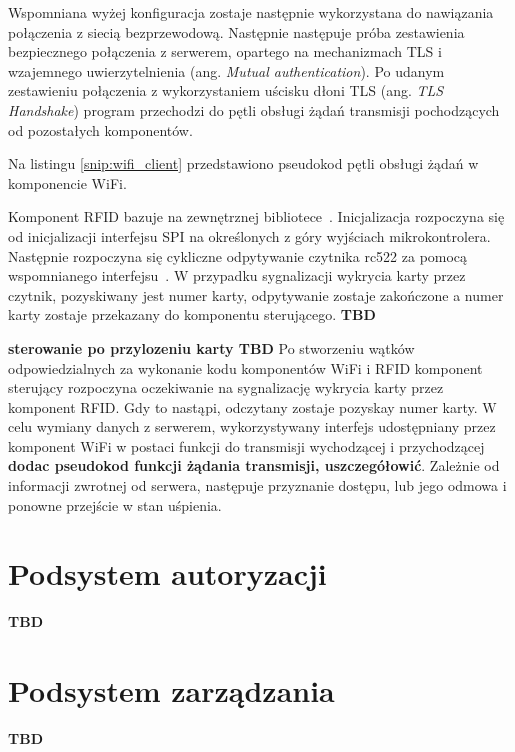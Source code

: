                Wspomniana wyżej konfiguracja zostaje następnie wykorzystana do nawiązania połączenia z siecią bezprzewodową. Następnie następuje próba zestawienia bezpiecznego połączenia z serwerem, opartego na mechanizmach TLS i wzajemnego uwierzytelnienia (ang. \textit{Mutual authentication}). Po udanym zestawieniu połączenia z wykorzystaniem uścisku dłoni TLS (ang. \textit{TLS Handshake}) program przechodzi do pętli obsługi żądań transmisji pochodzących od pozostałych komponentów.

                Na listingu \ref{snip:wifi_client} przedstawiono pseudokod pętli obsługi żądań w komponencie WiFi.

                

                Komponent RFID bazuje na zewnętrznej bibliotece~\cite{esp-idf-rc522}. Inicjalizacja rozpoczyna się od inicjalizacji interfejsu SPI na określonych z góry wyjściach mikrokontrolera. Następnie rozpoczyna się cykliczne odpytywanie czytnika rc522 za pomocą wspomnianego interfejsu~\cite{esp-idf-rc522}. W przypadku sygnalizacji wykrycia karty przez czytnik, pozyskiwany jest numer karty, odpytywanie zostaje zakończone a numer karty zostaje przekazany do komponentu sterującego. \textbf{TBD}

                \textbf{sterowanie po przylozeniu karty TBD}
                Po stworzeniu wątków odpowiedzialnych za wykonanie kodu komponentów WiFi i RFID komponent sterujący rozpoczyna oczekiwanie na sygnalizację wykrycia karty przez komponent RFID. Gdy to nastąpi, odczytany zostaje pozyskay numer karty. W celu wymiany danych z serwerem, wykorzystywany interfejs udostępniany przez komponent WiFi w postaci funkcji do transmisji wychodzącej i przychodzącej \textbf{dodac pseudokod funkcji żądania transmisji, uszczegółowić}. Zależnie od informacji zwrotnej od serwera, następuje przyznanie dostępu, lub jego odmowa i ponowne przejście w stan uśpienia.


    \section{Podsystem autoryzacji}
        \textbf{TBD}

    \section{Podsystem zarządzania}
        \textbf{TBD}

